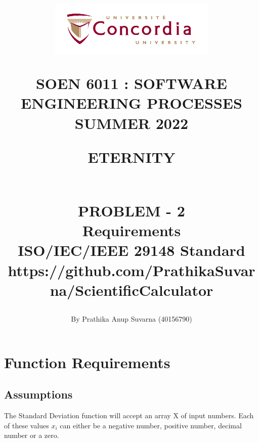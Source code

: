 \documentclass[12pt,letterpaper]{report}
\begin{document}
\title{\begin{figure}[htb]
\begin{center}
\includegraphics[width=8cm]{univ_logo}
\end{center}
\end{figure}SOEN 6011 : SOFTWARE ENGINEERING PROCESSES\\[.5em]
SUMMER 2022\\\vspace*{0.9in}
\begin{Large}
\textbf{ETERNITY} 
\end{Large}
\vspace*{0.9in}
\begin{Large}
\textbf{\\PROBLEM - 2} 
\\Requirements\\\footnotesize{ISO/IEC/IEEE} 29148 Standard \\
\small{https://github.com/PrathikaSuvarna/ScientificCalculator}
\end{Large}}
\author{By Prathika Anup Suvarna (40156790)}
\maketitle 
{}
\setcounter{page}{0}

\tableofcontents


\chapter{Function Requirements}

\section{Assumptions}

\normalsize{The Standard Deviation function will accept an array X of input numbers. Each of these values $x_i$ can either be a negative number, positive number, decimal number or a zero.}
\end{document}
